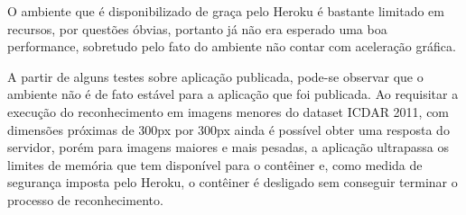 O ambiente que é disponibilizado de graça pelo Heroku é bastante limitado em recursos, por questões óbvias, portanto já não era esperado uma boa performance, sobretudo pelo fato do ambiente não contar com aceleração gráfica.

A partir de alguns testes sobre aplicação publicada, pode-se observar que o ambiente não é de fato estável para a aplicação que foi publicada. Ao requisitar a execução do reconhecimento em imagens menores do dataset ICDAR 2011, com dimensões próximas de 300px por 300px ainda é possível obter uma resposta do servidor, porém para imagens maiores e mais pesadas, a aplicação ultrapassa os limites de memória que tem disponível para o contêiner e, como medida de segurança imposta pelo Heroku, o contêiner é desligado sem conseguir terminar o processo de reconhecimento.